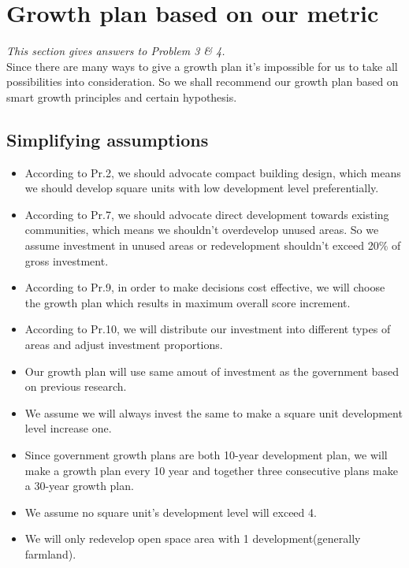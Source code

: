 
\section{Growth plan based on our metric}
\emph{This section gives answers to Problem 3 \& 4.}\\

Since there are many ways to give a growth plan it's impossible for us to take all possibilities into consideration.
So we shall recommend our growth plan based on smart growth principles and certain hypothesis.

\subsection{Simplifying assumptions}
\begin{itemize}
  \item According to Pr.2, we should advocate compact building design, which means we should develop square units with low development level preferentially.
  \item According to Pr.7, we should advocate direct development towards existing communities, which means we shouldn't overdevelop unused areas. So we assume investment in unused areas or redevelopment shouldn't exceed 20\% of gross investment.
  \item According to Pr.9, in order to make decisions cost effective, we will choose the growth plan which results in maximum overall score increment.
  \item According to Pr.10, we will distribute our investment into different types of areas and adjust investment proportions.
  \item Our growth plan will use same amout of investment as the government based on previous research.
  \item We assume we will always invest the same to make a square unit development level increase one.
  \item Since government growth plans are both 10-year development plan, we will make a growth plan every 10 year and together three consecutive plans make a 30-year growth plan.
  \item We assume no square unit's development level will exceed 4.
  \item We will only redevelop open space area with 1 development(generally farmland).
\end{itemize}

